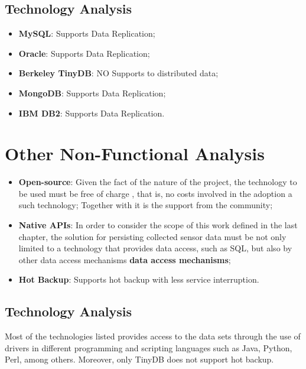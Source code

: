 \subsection{Technology Analysis}

\begin{itemize}
  \item \textbf{MySQL}: Supports Data Replication;
  \item \textbf{Oracle}: Supports Data Replication;
  \item \textbf{Berkeley TinyDB}: NO Supports to distributed data;
  \item \textbf{MongoDB}: Supports Data Replication;
  \item \textbf{IBM DB2}: Supports Data Replication.
\end{itemize}

\section{Other Non-Functional Analysis}

\begin{itemize}
  \item \textbf{Open-source}: Given the fact of the nature of the project, the
  technology to be used must be free of charge \cite{open-source}, that is, no
  costs involved in the adoption a such technology; Together with it is the
  support from the community;
  \item \textbf{Native APIs}: In order to consider the scope of this work
  defined in the last chapter, the solution for persisting collected sensor
  data must be not only limited to a technology that provides data access, such
  as SQL, but also by other data access mechanisms \textbf{data access
  mechanisms};
  \item \textbf{Hot Backup}: Supports hot backup with less service interruption. 
\end{itemize}

\subsection{Technology Analysis}

Most of the technologies listed provides access to the data sets through the
use of drivers in different programming and scripting languages such as Java,
Python, Perl, among others. Moreover, only TinyDB does not support hot backup.

